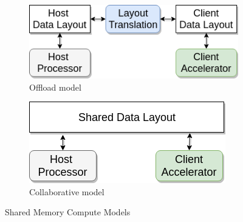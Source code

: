 \begin{figure}[htbp]
\centering
\begin{subfigure}{0.25\textwidth}
    \includegraphics[width=\textwidth]{figures/offload_model}
    \caption{Offload model}
    \label{fig:offload_model}
\end{subfigure}
\hfill
\begin{subfigure}{0.21\textwidth}
    \includegraphics[width=\textwidth]{figures/collaborative_model}
    \caption{Collaborative model}
    \label{fig:collaborative_model}
\end{subfigure}
\caption{Shared Memory Compute Models}
\label{fig:compute_model}
\end{figure}

